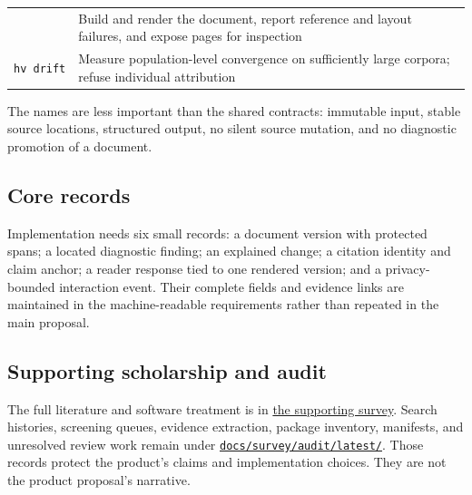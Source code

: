 \documentclass[
  11pt,
  english,
]{article}
\begin{document}
\begin{longtable}[]{@{}ll@{}}
\begin{minipage}[t]{0.47\columnwidth}
\end{minipage} & \begin{minipage}[t]{0.47\columnwidth}\raggedright
Build and render the document, report reference and layout failures, and
expose pages for inspection\strut
\end{minipage}\tabularnewline
\begin{minipage}[t]{0.47\columnwidth}\raggedright
\texttt{hv\ drift}\strut
\end{minipage} & \begin{minipage}[t]{0.47\columnwidth}\raggedright
Measure population-level convergence on sufficiently large corpora;
refuse individual attribution\strut
\end{minipage}\tabularnewline
\bottomrule
\end{longtable}

The names are less important than the shared contracts: immutable input,
stable source locations, structured output, no silent source mutation,
and no diagnostic promotion of a document.

\hypertarget{core-records}{%
\subsection{Core records}\label{core-records}}

Implementation needs six small records: a document version with
protected spans; a located diagnostic finding; an explained change; a
citation identity and claim anchor; a reader response tied to one
rendered version; and a privacy-bounded interaction event. Their
complete fields and evidence links are maintained in the
machine-readable requirements rather than repeated in the main proposal.

\hypertarget{supporting-scholarship-and-audit}{%
\subsection{Supporting scholarship and
audit}\label{supporting-scholarship-and-audit}}

The full literature and software treatment is in
\href{humanvoice_survey.pdf}{the supporting survey}. Search histories,
screening queues, evidence extraction, package inventory, manifests, and
unresolved review work remain under
\href{audit/latest/}{\texttt{docs/survey/audit/latest/}}. Those records
protect the product's claims and implementation choices. They are not
the product proposal's narrative.

  
\end{document}
